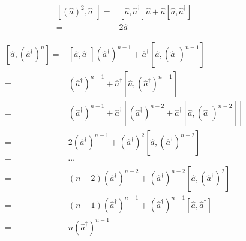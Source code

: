 \documentclass[twoside]{article}
\begin{document}
\begin{equation*}
    \begin{split}
        \left[\left(\hat{a}\right)^2, \hat{a}^{\dagger}\right] = & \left[\hat{a}, \hat{a}^\dagger\right] \hat{a} + \hat{a}\left[\hat{a}, \hat{a}^\dagger\right] \\
        =                                                        & 2 \hat{a}
    \end{split}
\end{equation*}

\begin{equation*}
    \begin{split}
        \left[\hat{a}, \left(\hat{a}^{\dagger}\right)^n\right] = & \left[\hat{a}, \hat{a}^\dagger\right] \left(\hat{a}^\dagger\right)^{n-1} + \hat{a}^\dagger \left[\hat{a}, \left(\hat{a}^\dagger\right)^{n-1}\right]                             \\
        =                                                        & \left(\hat{a}^\dagger\right)^{n-1} + \hat{a}^\dagger \left[\hat{a}, \left(\hat{a}^\dagger\right)^{n-1}\right]                                                                   \\
        =                                                        & \left(\hat{a}^\dagger\right)^{n-1} + \hat{a}^\dagger \left[\left(\hat{a}^\dagger\right)^{n-2} + \hat{a}^\dagger \left[\hat{a}, \left(\hat{a}^\dagger\right)^{n-2}\right]\right] \\
        =                                                        & 2 \left(\hat{a}^\dagger\right)^{n-1} + \left(\hat{a}^\dagger\right)^2 \left[\hat{a}, \left(\hat{a}^\dagger\right)^{n-2}\right]                                                  \\
        =                                                        & \cdots                                                                                                                                                                          \\
        =                                                        & \left(n-2\right) \left(\hat{a}^\dagger\right)^{n-2} + \left(\hat{a}^\dagger\right)^{n-2} \left[\hat{a}, \left(\hat{a}^\dagger\right)^{2}\right]                                 \\
        =                                                        & \left(n-1\right) \left(\hat{a}^\dagger\right)^{n-1} + \left(\hat{a}^\dagger\right)^{n-1} \left[\hat{a}, \hat{a}^\dagger\right]                                                  \\
        =                                                        & n \left(\hat{a}^\dagger\right)^{n-1}
    \end{split}
\end{equation*}
\end{document}
